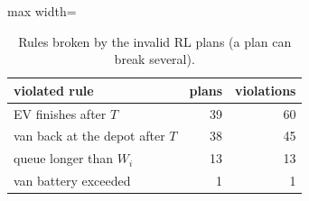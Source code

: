 \begin{table}[H]\centering
\caption{Rules broken by the invalid RL plans (a plan can break several).}\label{tab:violations}
\begin{adjustbox}{max width=\textwidth}\begin{tabular}{lrr}\toprule
violated rule & plans & violations \\ \midrule
EV finishes after $T$ & 39 & 60 \\
van back at the depot after $T$ & 38 & 45 \\
queue longer than $W_i$ & 13 & 13 \\
van battery exceeded & 1 & 1 \\
\bottomrule\end{tabular}\end{adjustbox}\end{table}
